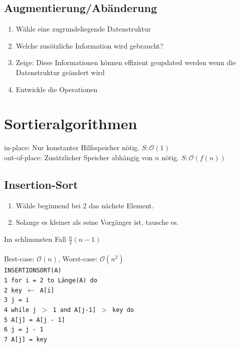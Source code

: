 \documentclass[fs, footer]{latex4ei}
\renewcommand{\t}{\texttt}
\begin{document}
\begin{multicols*}{4}
{{\subsection{Augmentierung/Abänderung}
\begin{enumerate}
	\item Wähle eine zugrundeliegende Datenstruktur
	\item Welche zusätzliche Information wird gebraucht?
	\item Zeige: Diese Informationen können effizient geupdated werden wenn die Datenstruktur geändert wird
	\item Entwickle die Operationen
\end{enumerate}

\section{Sortieralgorithmen}
in-place: Nur konstanter Hilfsspeicher nötig. $S:\mathcal O(1)$\\
out-of-place: Zusätzlicher Speicher abhängig von $n$ nötig. $S:\mathcal O(f(n))$\\


\subsection{Insertion-Sort}
\begin{enumerate}
	\item Wähle beginnend bei 2 das nächste Element. 
	\item Solange es kleiner als seine Vorgänger ist, tausche es.
\end{enumerate}
Im schlimmsten Fall $\frac{n}{2}(n-1)$\\
\\Best-case: $\mathcal{O}(n)$, Worst-case: $\mathcal{O}(n^2)$\\
\t{INSERTIONSORT(A)\\
1\ for i = 2 to Länge(A) do\\
2\ \quad key $\leftarrow$ A[i]\\
3\ \quad j = i\\
4\ \quad while j $>$ 1 and A[j-1] $>$ key do\\
5\ \qquad 	A[j] = A[j - 1]\\
6\ \qquad 	j = j - 1\\
7\ \quad 	A[j] = key
}

}}
\end{multicols*}
\end{document}
